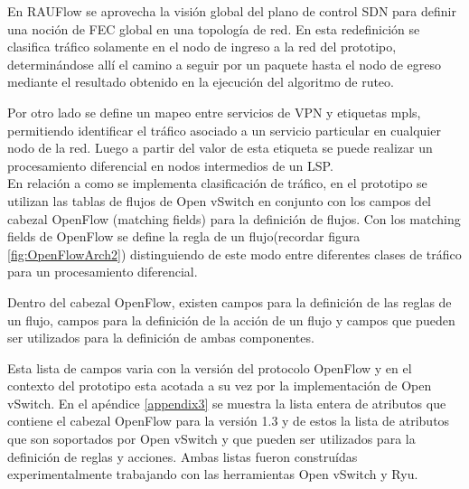 En RAUFlow se aprovecha la visi\'on global del plano de control SDN para definir una noci\'on de FEC global en una topolog\'ia de red. En esta redefinici\'on se clasifica tr\'afico solamente en el nodo de ingreso a la red del prototipo, determinándose all\'i el camino a seguir por un paquete hasta el nodo de egreso mediante el resultado obtenido en la ejecuci\'on del algoritmo de ruteo. 


Por otro lado se define un mapeo entre servicios de VPN y etiquetas mpls, permitiendo identificar el tr\'afico asociado a un servicio particular en cualquier nodo de la red. Luego a partir del valor de esta etiqueta se puede realizar un procesamiento diferencial en nodos intermedios de un LSP.\\


En relaci\'on a como se implementa clasificaci\'on de tr\'afico, en el prototipo se utilizan las tablas de flujos de Open vSwitch en conjunto con los campos del cabezal OpenFlow (matching fields) para la definici\'on de flujos. Con los matching fields de OpenFlow se define la regla de un flujo(recordar figura \ref{fig:OpenFlowArch2}) distinguiendo de este modo entre diferentes clases de tr\'afico para un procesamiento diferencial.

Dentro del cabezal OpenFlow, existen campos para la definici\'on de las reglas de un flujo, campos para la definici\'on de la acci\'on de un flujo y campos que pueden ser utilizados para la definici\'on de ambas componentes.  

Esta lista de campos varia con la versi\'on del protocolo OpenFlow y en el contexto del prototipo esta acotada a su vez por la implementaci\'on de Open vSwitch. En el ap\'endice \ref{appendix3} se muestra  la lista entera de atributos que contiene el cabezal OpenFlow para la versi\'on 1.3 y de estos la lista de atributos que son soportados por Open vSwitch y que pueden ser utilizados para la definici\'on de reglas y acciones. Ambas listas fueron constru\'idas experimentalmente trabajando con las herramientas Open vSwitch y Ryu.\\

